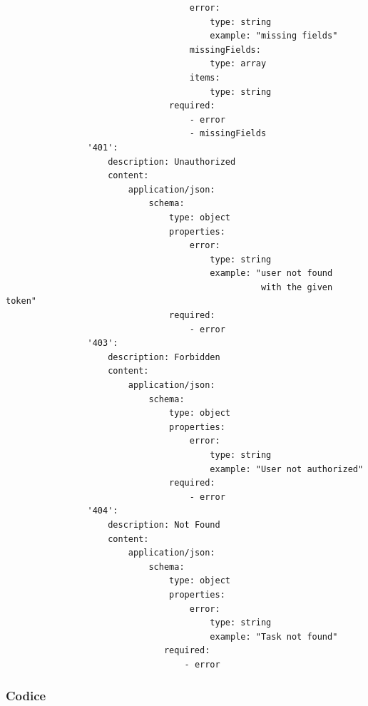 \documentclass{report}
\begin{document}
\begin{verbatim}
                                    error:
                                        type: string
                                        example: "missing fields"
                                    missingFields:
                                        type: array
                                    items:
                                        type: string
                                required:
                                    - error
                                    - missingFields
                '401':
                    description: Unauthorized
                    content:
                        application/json:
                            schema:
                                type: object
                                properties:
                                    error:
                                        type: string
                                        example: "user not found
                                                  with the given token"
                                required:
                                    - error
                '403':
                    description: Forbidden
                    content:
                        application/json:
                            schema:
                                type: object
                                properties:
                                    error:
                                        type: string
                                        example: "User not authorized"
                                required:
                                    - error
                '404':
                    description: Not Found
                    content:
                        application/json:
                            schema:
                                type: object
                                properties:
                                    error:
                                        type: string
                                        example: "Task not found"
                               required:
                                   - error
\end{verbatim}

\subsubsection*{Codice}
\end{document}
